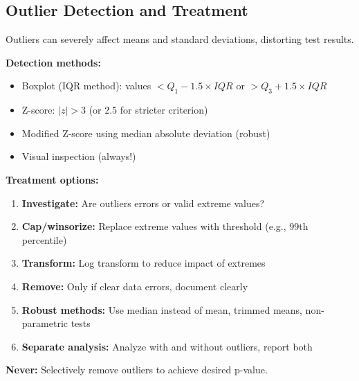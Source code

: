 \subsection{Outlier Detection and Treatment}

Outliers can severely affect means and standard deviations, distorting test results.

\textbf{Detection methods:}
\begin{itemize}
    \item Boxplot (IQR method): values $< Q_1 - 1.5 \times IQR$ or $> Q_3 + 1.5 \times IQR$
    \item Z-score: $|z| > 3$ (or 2.5 for stricter criterion)
    \item Modified Z-score using median absolute deviation (robust)
    \item Visual inspection (always!)
\end{itemize}

\textbf{Treatment options:}
\begin{enumerate}
    \item \textbf{Investigate:} Are outliers errors or valid extreme values?

    \item \textbf{Cap/winsorize:} Replace extreme values with threshold (e.g., 99th percentile)

    \item \textbf{Transform:} Log transform to reduce impact of extremes

    \item \textbf{Remove:} Only if clear data errors, document clearly

    \item \textbf{Robust methods:} Use median instead of mean, trimmed means, non-parametric tests

    \item \textbf{Separate analysis:} Analyze with and without outliers, report both
\end{enumerate}

\textbf{Never:} Selectively remove outliers to achieve desired p-value.

